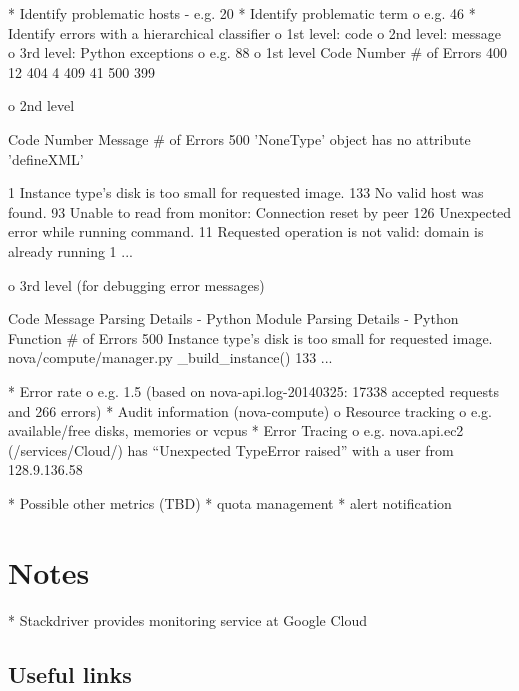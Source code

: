 \documentclass{sig-alternate}
\begin{document}
*  Identify problematic hosts
- e.g. 20%
*  Identify problematic term
o       e.g. 46%
*  Identify errors with a hierarchical classifier
o       1st level: code
o       2nd level: message
o       3rd level: Python exceptions
o       e.g. 88%
o       1st level
Code Number     \# of Errors
400     12
404     4
409     41
500     399

o       2nd level


Code Number     Message \# of Errors
500     'NoneType' object has no attribute 'defineXML'  

        1
        Instance type's disk is too small for requested image.          133
        No valid host was found.        93
        Unable to read from monitor: Connection reset by peer   126
        Unexpected error while running command. 11
        Requested operation is not valid: domain is already running     1
        ...     

o       3rd level (for debugging error messages)


Code    Message Parsing Details - Python Module Parsing Details - Python Function       \# of Errors
500     Instance type's disk is too small for requested image.  nova/compute/manager.py \_build\_instance()     133
...                             

*  Error rate
o       e.g. 1.5 %
(based on nova-api.log-20140325: 17338 accepted requests and 266 errors)
*  Audit information (nova-compute)
o       Resource tracking
o       e.g. available/free disks, memories or vcpus
*  Error Tracing
o       e.g. nova.api.ec2 (/services/Cloud/) has “Unexpected TypeError raised” with a user from 128.9.136.58

*  Possible other metrics (TBD)
*  quota management
*  alert notification

\section{Notes}

*  Stackdriver provides monitoring service at Google Cloud

\subsection{Useful links}
\end{document}
